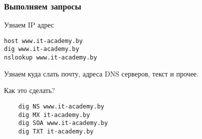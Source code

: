 \begin{frame}[fragile]
    \frametitle{Выполняем запросы}
Узнаем IP адрес
\begin{lstlisting}
host www.it-academy.by
dig www.it-academy.by
nslookup www.it-academy.by
\end{lstlisting}

Узнаем куда слать почту, адреса DNS серверов, текст и прочее. 

Как это сделать?
\begin{lstlisting}
    dig NS www.it-academy.by
    dig MX it-academy.by
    dig SOA www.it-academy.by
    dig TXT it-academy.by
\end{lstlisting}

\end{frame}